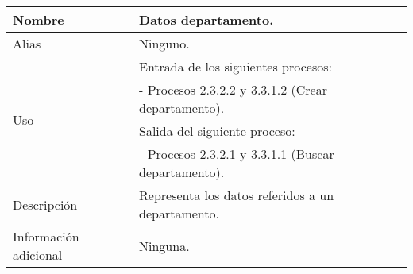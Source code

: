 \begin{center}
  \begin{tabular}{| l | p{9cm} |}
    \hline
    Nombre & \textbf{Datos departamento}.\\
    \hline
    Alias & Ninguno.\\
    \hline
    \multirow{4}{*}{Uso} & Entrada de los siguientes procesos:\\
                         & - Procesos 2.3.2.2 y 3.3.1.2 (Crear departamento).\\
                         & Salida del siguiente proceso:\\
                         & - Procesos 2.3.2.1 y 3.3.1.1 (Buscar departamento).\\
    \hline
    Descripción & Representa los datos referidos a un departamento.\\
    \hline
    Información adicional & Ninguna.\\
    \hline
  \end{tabular}
\end{center}
